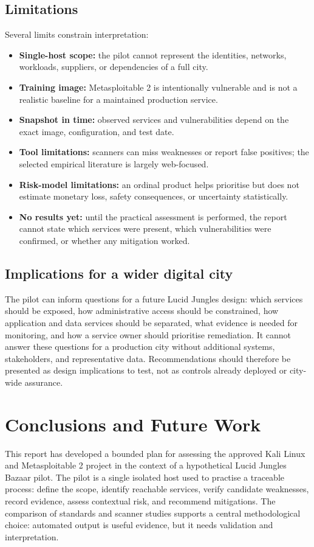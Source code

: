 \documentclass[11pt,a4paper]{article}
\begin{document}
\subsection{Limitations}
Several limits constrain interpretation:
\begin{itemize}
  \item \textbf{Single-host scope:} the pilot cannot represent the identities, networks, workloads, suppliers, or dependencies of a full city.
  \item \textbf{Training image:} Metasploitable 2 is intentionally vulnerable and is not a realistic baseline for a maintained production service.
  \item \textbf{Snapshot in time:} observed services and vulnerabilities depend on the exact image, configuration, and test date.
  \item \textbf{Tool limitations:} scanners can miss weaknesses or report false positives; the selected empirical literature is largely web-focused.
  \item \textbf{Risk-model limitations:} an ordinal product helps prioritise but does not estimate monetary loss, safety consequences, or uncertainty statistically.
  \item \textbf{No results yet:} until the practical assessment is performed, the report cannot state which services were present, which vulnerabilities were confirmed, or whether any mitigation worked.
\end{itemize}

\subsection{Implications for a wider digital city}
The pilot can inform questions for a future Lucid Jungles design: which services should be exposed, how administrative access should be constrained, how application and data services should be separated, what evidence is needed for monitoring, and how a service owner should prioritise remediation. It cannot answer these questions for a production city without additional systems, stakeholders, and representative data. Recommendations should therefore be presented as design implications to test, not as controls already deployed or city-wide assurance.

\section{Conclusions and Future Work}
This report has developed a bounded plan for assessing the approved Kali Linux and Metasploitable 2 project in the context of a hypothetical Lucid Jungles Bazaar pilot. The pilot is a single isolated host used to practise a traceable process: define the scope, identify reachable services, verify candidate weaknesses, record evidence, assess contextual risk, and recommend mitigations. The comparison of standards and scanner studies supports a central methodological choice: automated output is useful evidence, but it needs validation and interpretation.
\end{document}
